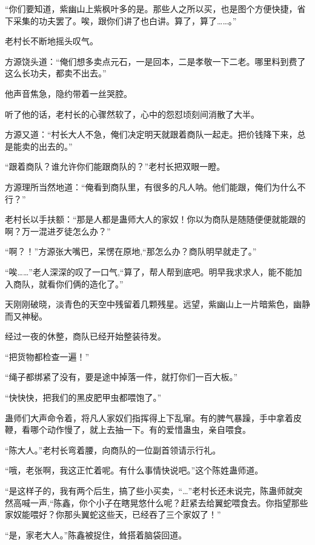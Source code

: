
\begin{this_body}

“你们要知道，紫幽山上紫枫叶多的是。那些人之所以买，也是图个方便快捷，省下采集的功夫罢了。唉，跟你们讲了也白讲。算了，算了……。”

老村长不断地摇头叹气。

方源饶头道：“俺们想多卖点元石，一是回本，二是孝敬一下二老。哪里料到费了这么长功夫，都卖不出去。”

他声音焦急，隐约带着一丝哭腔。

听了他的话，老村长的心骤然软了，心中的怨怼顷刻间消散了大半。

方源又道：“村长大人不急，俺们决定明天就跟着商队一起走。把价钱降下来，总是能卖的出去的。”

“跟着商队？谁允许你们能跟商队的？”老村长把双眼一瞪。

方源理所当然地道：“俺看到商队里，有很多的凡人呐。他们能跟，俺们为什么不行？”

老村长以手扶额：“那是人都是蛊师大人的家奴！你以为商队是随随便便就能跟的啊？万一混进歹徒怎么办？”

“啊？！”方源张大嘴巴，呆愣在原地,“那怎么办？商队明早就走了。”

“唉……”老人深深的叹了一口气,“算了，帮人帮到底吧。明早我求求人，能不能加入商队，就看你们俩的造化了。”

天刚刚破晓，淡青色的天空中残留着几颗残星。远望，紫幽山上一片暗紫色，幽静而又神秘。

经过一夜的休整，商队已经开始整装待发。

“把货物都检查一遍！”

“绳子都绑紧了没有，要是途中掉落一件，就打你们一百大板。”

“快快快，把我们的黑皮肥甲虫都喂饱了。”

蛊师们大声命令着，将凡人家奴们指挥得上下乱窜。有的脾气暴躁，手中拿着皮鞭，看哪个动作慢了，就上去抽一下。有的爱惜蛊虫，亲自喂食。

“陈大人。”老村长弯着腰，向商队的一位副首领请示行礼。

“哦，老张啊，我这正忙着呢。有什么事情快说吧。”这个陈姓蛊师道。

“是这样子的，我有两个后生，搞了些小买卖，“…”老村长还未说完，陈蛊师就突然高喊一声,“陈鑫，你个小子在瞎晃悠什么呢？赶紧去给翼蛇喂食去。你指望那些家奴能喂好？你那头翼蛇这些天，已经吞了三个家奴了！”

“是，家老大人。”陈鑫被捉住，耸搭着脑袋回道。


\end{this_body}
